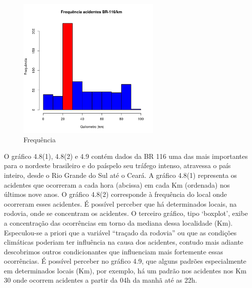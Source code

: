\quad \quad
\begin{figure}[h]
	\centering
	\caption{ Frequência}
	\includegraphics[width=7cm,height=7cm]{Figuras/Preprocess/br116_3.png}
\end{figure}
O gráfico 4.8(1), 4.8(2)  e 4.9 contém dados da BR 116 uma das mais importantes para o nordeste brasileiro e do paíspelo seu tráfego intenso, atravessa o país inteiro, desde o Rio Grande do Sul até o Ceará. 
A gráfico 4.8(1) representa os acidentes que ocorreram a cada hora (abcissa) em cada Km (ordenada) nos últimos nove anos. 
O  gráfico 4.8(2) corresponde à frequência do local onde ocorreram esses acidentes. 
É possível perceber que há determinados locais, na rodovia, onde se concentram os acidentes. 
O terceiro gráfico, tipo ‘boxplot’, exibe a concentração das ocorrências em torno da mediana dessa localidade (Km). 
Especulou-se a priori que a variável “traçado da rodovia” ou que as condições climáticas poderiam ter influência na causa dos acidentes, contudo mais adiante descobrimos outros condicionantes que influenciam mais fortemente essas ocorrências. 
É possível perceber no gráfico 4.9, que alguns padrões especialmente em determinados locais (Km), por exemplo, há um padrão nos acidentes nos Km 30 onde ocorrem acidentes a partir da 04h da manhã até as 22h. 

\pagebreak

